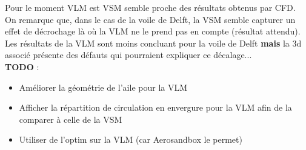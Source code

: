 \documentclass[conference]{IEEEtran}
\begin{document}
Pour le moment VLM est VSM semble proche des résultats obtenus par CFD. \\
On remarque que, dans le cas de la voile de Delft, la VSM semble capturer un effet de décrochage là où la VLM ne le prend pas en compte (résultat attendu).\\
Les résultats de la VLM sont moins concluant pour la voile de Delft \textbf{mais} la 3d associé présente des défauts qui pourraient expliquer ce décalage... \\

\textbf{TODO} :
\begin{itemize}
    \item Améliorer la géométrie de l'aile pour la VLM
    \item Afficher la répartition de circulation en envergure pour la VLM afin de la comparer à celle de la VSM
    \item Utiliser de l'optim sur la VLM (car Aerosandbox le permet)
\end{itemize}
\end{document}
